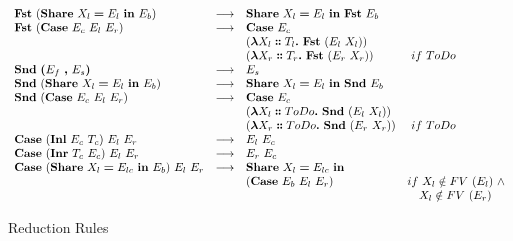 \documentclass[11p,a4paper]{article}
\newcommand{\expabs}[3]{\boldsymbol{\lambda}#1\boldsymbol{\dblcolon}#2\boldsymbol{.}\ #3}
\newcommand{\expapp}[2]{#1\ #2}
\newcommand{\expshr}[3]{\mathbf{Share}\ #1\boldsymbol{=}#2\ \mathbf{in}\ #3}
\newcommand{\expprd}[2]{\boldsymbol{(}#1\ \boldsymbol{,}\ #2\boldsymbol{)}}
\newcommand{\expfst}[1]{\mathbf{Fst}\ #1}
\newcommand{\expsnd}[1]{\mathbf{Snd}\ #1}
\newcommand{\explft}[2]{\mathbf{Inl}\ #1\ #2}
\newcommand{\exprgt}[2]{\mathbf{Inr}\ #1\ #2}
\newcommand{\expcas}[3]{\mathbf{Case}\ #1\ #2\ #3}
\newcommand{\fv}[1]{FV\ (#1)}
\newcommand{\valuep}[1]{Value\ (#1)}
\begin{document}
\begin{figure*}[h]
\[\begin{array}{lcll}
\expfst{(\expshr{X_l}{E_l}{E_b})}                    & \longrightarrow 
& \expshr{X_l}{E_l}{\expfst E_b}                   & \\

\expfst{(\expcas{E_c}{E_l}{E_r})}                    & \longrightarrow 
& \expcas{E_c}{\\ & & (\expabs{X_l}{T_l}{\expfst{(\expapp{E_l}{X_l})}})}{\\ & & (\expabs{X_r}{T_r}{\expfst{(\expapp{E_r}{X_r})}})} &\ if\ ToDo \\

\expsnd{\expprd{E_f}{E_s}}                         & \longrightarrow 
& E_s                                              & \\

\expsnd{(\expshr{X_l}{E_l}{E_b})}                    & \longrightarrow 
& \expshr{X_l}{E_l}{\expsnd E_b}                   & \\

\expsnd{(\expcas{E_c}{E_l}{E_r})}                    & \longrightarrow 
& \expcas{E_c}{\\ & & (\expabs{X_l}{ToDo}{\expsnd{(\expapp{E_l}{X_l})}})}{\\ & & (\expabs{X_r}{ToDo}{\expsnd{(\expapp{E_r}{X_r})}})} &\ if\ ToDo \\


\expcas{(\explft{E_c}{T_c})}{E_l}{E_r}              & \longrightarrow 
& \expapp{E_l}{E_c}                                & \\

\expcas{(\exprgt{T_c}{E_c})}{E_l}{E_r}              & \longrightarrow 
& \expapp{E_r}{E_c}                                 & \\

\expcas{(\expshr{X_l}{E_{lc}}{E_b})}{E_l}{E_r}         & \longrightarrow 
& \expshr{X_l}{E_{lc}}{\\&&(\expcas{E_b}{E_l}{E_r})}       & if\ X_l \notin \fv{E_l}\ \wedge \\ & & &\ \ \ X_l \notin \fv{E_r} 
 

\end{array}
\]
\caption{Reduction Rules}
\label{fig:red}
\end{figure*} 
\end{document}
